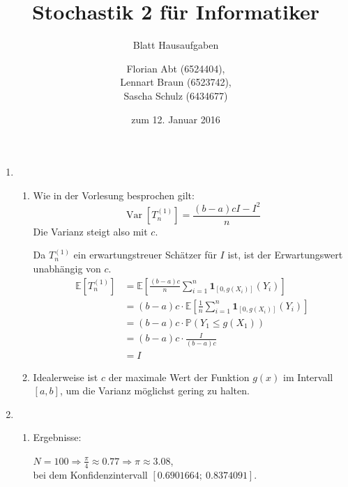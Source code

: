 \documentclass[a4paper]{scrartcl}
\title{Stochastik 2 für Informatiker}
\subtitle{Blatt {\blattnr} Hausaufgaben}
\author{
    Florian Abt (6524404), \\
    Lennart Braun (6523742), \\
    Sascha Schulz (6434677)
}
\date{zum 12. Januar 2016}
\newcommand{\prob}{\mathbb{P}}
\newcommand{\e}{\mathbb{E}}
\newcommand{\var}{\operatorname{Var}}
\def \blattnr {11}
\begin{document}
\maketitle

\begin{enumerate}[label=\bfseries \blattnr.\arabic*]
  \item %
    \begin{enumerate}
     \item %
         Wie in der Vorlesung besprochen gilt:
         \begin{equation*}
             \var\left[T_n^{(1)}\right] = \frac{(b-a)cI - I^2}{n}
         \end{equation*}
         Die Varianz steigt also mit $c$.

         Da $T_n^{(1)}$ ein erwartungstreuer Schätzer für $I$ ist, ist der
         Erwartungswert unabhängig von $c$.
         \begin{equation*}
             \begin{split}
                 \e\left[T_n^{(1)}\right]
                 &= \e \left[ \frac{(b-a)c}{n} \sum_{i=1}^n \mathbf{1}_{[0,g(X_i)]}(Y_i) \right] \\
                 &= (b-a)c \cdot \e \left[ \frac{1}{n} \sum_{i=1}^n \mathbf{1}_{[0,g(X_i)]}(Y_i) \right] \\
                 &= (b-a)c \cdot \prob(Y_1 \leq g(X_1)) \\
                 &= (b-a)c \cdot \frac{I}{(b-a)c} \\
                 &= I
             \end{split}
         \end{equation*}

     \item %
     Idealerweise ist $c$ der maximale Wert der Funktion $g(x)$ im Intervall 
     $[a,b]$, um die Varianz möglichst gering zu halten.

    \end{enumerate}
  \item %
    \begin{enumerate}
     \item %
         

         Ergebnisse:

         $N = 100 \Rightarrow \frac\pi4 \approx \num{0.77} \Rightarrow \pi \approx \num{3.08}$, \\
         bei dem Konfidenzintervall $[\num{0.6901664} ;\ \num{0.8374091}]$.


\end{enumerate}
\end{enumerate}
\end{document}
